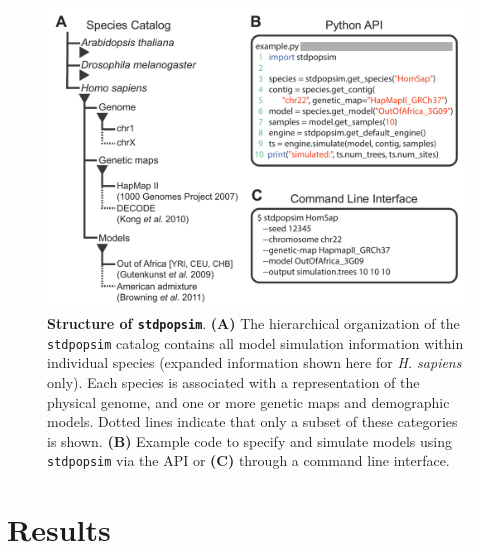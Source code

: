\documentclass[12pt,halfline,a4paper]{ouparticle}
\newcommand{\stdpopsim}{\texttt{stdpopsim}\xspace}
\begin{document}
\begin{figure}[t]
\begin{center}
\includegraphics[width=0.7\linewidth]{display_items/Figure1.pdf}
    \caption{\textbf{Structure of \stdpopsim}. \textbf{(A)} The
hierarchical organization of the \stdpopsim catalog contains all model simulation information
within individual species (expanded information shown here for \emph{H. sapiens} only). 
Each species is associated with a representation of the physical genome, and one or more genetic maps and demographic models.
Dotted lines indicate that only a subset of these categories is shown. \textbf{(B)} Example code to specify
and simulate models using \stdpopsim via the API or \textbf{(C)} through a command line interface.}
\label{fig:cartoon}
\end{center}
\end{figure}

\section*{Results}
\end{document}

